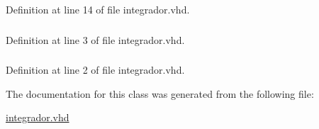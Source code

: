 Definition at line 14 of file integrador.\+vhd.

\hypertarget{classintegrador_aa4b2b25246a821511120e3149b003563}{}
\subsubsection[{S\+T\+D\+\_\+\+L\+O\+G\+I\+C\+\_\+1164}]{\hspace{0.3cm}{\ttfamily [Package]}}\label{classintegrador_aa4b2b25246a821511120e3149b003563}


Definition at line 3 of file integrador.\+vhd.

\hypertarget{classintegrador_a241c3e72dd8024cc8ae831b1b2aed7db}{}
\subsubsection[{S\+T\+D\+\_\+\+L\+O\+G\+I\+C\+\_\+\+U\+N\+S\+I\+G\+N\+E\+D}]{\hspace{0.3cm}{\ttfamily [Package]}}\label{classintegrador_a241c3e72dd8024cc8ae831b1b2aed7db}


Definition at line 2 of file integrador.\+vhd.



The documentation for this class was generated from the following file\+:\begin{DoxyCompactItemize}
\item 
\hyperlink{integrador_8vhd}{integrador.\+vhd}\end{DoxyCompactItemize}
